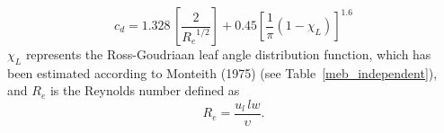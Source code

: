 %
\begin{equation}
  \label{eq:meb_cd}
  c_d = 1.328 \, \left[\frac{2}{{R_e}^{1/2}}\right] + 
0.45 \left[ \frac{1}{\pi}(1-\chi_L) \right]^{1.6}
\end{equation}
%
$\chi_L$ represents the Ross-Goudriaan leaf angle distribution function, which has
been estimated according to 
Monteith (1975)\nocite{Monteith75}
(see Table~\ref{meb_independent}), and
$R_e$ is the Reynolds number defined as
%
\begin{equation}
  \label{eq:meb_Re}
  {R_e} = \frac{u_l \, lw}{\upsilon}.
\end{equation}
%
%
%

